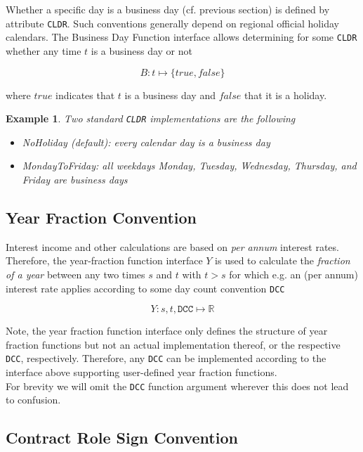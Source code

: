 \documentclass[9pt,oneside]{amsart}
\newtheorem{example}{Example}
\newcommand{\Real}{\mathbb{R}}
\newcommand{\attr}[1]{\texttt{#1}}
\newcommand{\yfrfunc}{Y}
\begin{document}
\begin{multicols}{2}
Whether a specific day is a business day (cf. previous section) is defined by attribute \attr{CLDR}. Such conventions generally depend on regional official holiday calendars. The Business Day Function interface allows determining for some \attr{CLDR} whether any time $t$ is a business day or not

\[
	B: t \mapsto \{true, false\}
\]

where $true$ indicates that $t$ is a business day and $false$ that it is a holiday.


\begin{example}
Two standard \attr{CLDR} implementations are the following
\begin{itemize}
	\item NoHoliday (default): every calendar day is a business day

	\item MondayToFriday: all weekdays Monday, Tuesday, Wednesday, Thursday, and Friday are business days
\end{itemize}
\end{example}


\subsection{Year Fraction Convention}\label{sec:yearfrac}

Interest income and other calculations are based on \textit{per annum} interest rates. Therefore, the year-fraction function interface $Y$ is used to calculate the \textit{fraction of a year} between any two times $s$ and $t$ with $t>s$ for which e.g. an (per annum) interest rate applies according to some day count convention \attr{DCC}

\[
	\yfrfunc: s,t,\attr{DCC} \mapsto \Real
\]

Note, the year fraction function interface only defines the structure of year fraction functions but not an actual implementation thereof, or the respective \attr{DCC}, respectively. Therefore, any \attr{DCC} can be implemented according to the interface above supporting user-defined year fraction functions.\\

For brevity we will omit the \attr{DCC} function argument wherever this does not lead to confusion.


\subsection{Contract Role Sign Convention}\label{sec:cntrl}


\end{multicols}
\end{document}
